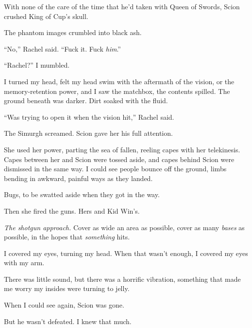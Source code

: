 With none of the care of the time that he'd taken with Queen of Swords, Scion crushed King of Cup's skull.



The phantom images crumbled into black ash.



``No,'' Rachel said.  ``Fuck it.  Fuck \emph{him}.''



``Rachel?'' I mumbled.



I turned my head, felt my head swim with the aftermath of the vision, or the memory-retention power, and I saw the matchbox, the contents spilled.  The ground beneath was darker.  Dirt soaked with the fluid.



``Was trying to open it when the vision hit,'' Rachel said.



The Simurgh screamed.  Scion gave her his full attention.



She used her power, parting the sea of fallen, reeling capes with her telekinesis.  Capes between her and Scion were tossed aside, and capes behind Scion were dismissed in the same way.  I could see people bounce off the ground, limbs bending in awkward, painful ways as they landed.



Bugs, to be swatted aside when they got in the way.



Then she fired the guns.  Hers and Kid Win's.



\emph{The shotgun approach.}  Cover as wide an area as possible, cover as many \emph{bases} as possible, in the hopes that \emph{something} hits.



I covered my eyes, turning my head.  When that wasn't enough, I covered my eyes with my arm.



There was little sound, but there was a horrific vibration, something that made me worry my insides were turning to jelly.



When I could see again, Scion was gone.



But he wasn't defeated.  I knew that much.



